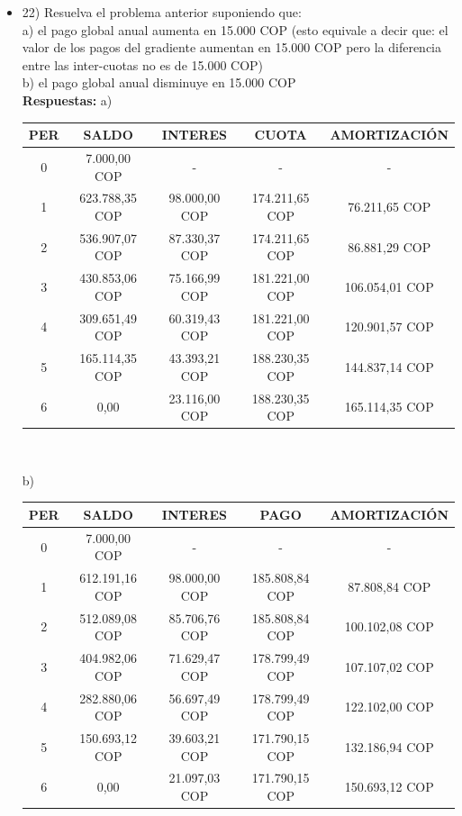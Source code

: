 \begin{itemize}
 \item 22) Resuelva el problema anterior suponiendo que:\\

       a)	el pago global anual aumenta en 15.000 COP (esto equivale a decir que: el valor de los pagos del gradiente aumentan en 15.000 COP pero la diferencia entre las inter-cuotas no es de 15.000 COP) \\
       b)	el pago global anual disminuye en 15.000 COP\\
       \textbf{ Respuestas:}
       a)
       \begin{center}
        \begin{tabular}{| c | c | c | c | c |}\hline
           \textbf{PER} & \textbf{SALDO} & \textbf{INTERES} & \textbf{CUOTA} & \textbf{AMORTIZACIÓN} \\ \hline
        0 & 7.000,00 COP & - & - & -  \\ \hline
        1 & 623.788,35 COP & 98.000,00 COP & 174.211,65 COP & 76.211,65 COP \\ \hline
        2 & 536.907,07 COP & 87.330,37 COP & 174.211,65 COP & 86.881,29 COP \\ \hline
        3 & 430.853,06 COP & 75.166,99 COP & 181.221,00 COP & 106.054,01 COP \\ \hline
        4 & 309.651,49 COP & 60.319,43 COP & 181.221,00 COP & 120.901,57 COP \\ \hline
        5 & 165.114,35 COP & 43.393,21 COP & 188.230,35 COP & 144.837,14 COP \\ \hline
        6 & 0,00 & 23.116,00 COP & 188.230,35 COP & 165.114,35 COP \\ \hline
        \end{tabular}\\
        \end{center}
       b)
       \begin{center}
        \begin{tabular}{| c | c | c | c | c |}\hline
           \textbf{PER} & \textbf{SALDO} & \textbf{INTERES} & \textbf{PAGO} & \textbf{AMORTIZACIÓN}  \\ \hline
        0 & 7.000,00 COP & - & - & -  \\ \hline
        1 & 612.191,16 COP & 98.000,00 COP & 185.808,84 COP & 87.808,84 COP \\ \hline
        2 & 512.089,08 COP & 85.706,76 COP & 185.808,84 COP & 100.102,08 COP \\ \hline
        3 & 404.982,06 COP & 71.629,47 COP & 178.799,49 COP & 107.107,02 COP \\ \hline
        4 & 282.880,06 COP & 56.697,49 COP & 178.799,49 COP & 122.102,00 COP \\ \hline
        5 & 150.693,12 COP & 39.603,21 COP & 171.790,15 COP & 132.186,94 COP \\ \hline
        6 & 0,00 & 21.097,03 COP & 171.790,15 COP & 150.693,12 COP \\ \hline
        \end{tabular}\\
        \end{center}


\end{itemize}

